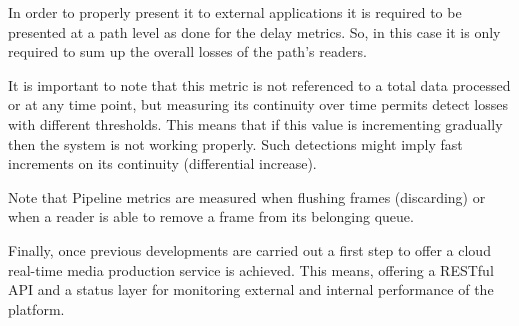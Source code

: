 In order to properly present it to external applications it is required to be presented at a path level as done for the delay metrics. So, in this case it is only required to sum up the overall losses of the path's readers.

It is important to note that this metric is not referenced to a total data processed or at any time point, but measuring its continuity over time permits detect losses with different thresholds. This means that if this value is incrementing gradually then the system is not working properly. Such detections might imply fast increments on its continuity (differential increase). 

Note that Pipeline metrics are measured when flushing frames (discarding) or when a reader is able to remove a frame from its belonging queue. 

Finally, once previous developments are carried out a first step to offer a cloud real-time media production service is achieved. This means, offering a RESTful API and a status layer for monitoring external and internal performance of the platform.